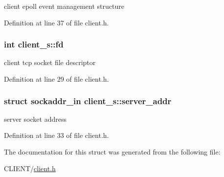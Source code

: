 client epoll event management structure 



Definition at line 37 of file client.\-h.

\hypertarget{structclient__s_a9babf0c4dea4b555e6b87a47f4ca98cd}{
\subsubsection[{fd}]{\setlength{\rightskip}{0pt plus 5cm}int client\-\_\-s\-::fd}}\label{structclient__s_a9babf0c4dea4b555e6b87a47f4ca98cd}


client tcp socket file descriptor 



Definition at line 29 of file client.\-h.

\hypertarget{structclient__s_a4cb8f28435762b205424d16ea39dcab3}{
\subsubsection[{server\-\_\-addr}]{\setlength{\rightskip}{0pt plus 5cm}struct sockaddr\-\_\-in client\-\_\-s\-::server\-\_\-addr}}\label{structclient__s_a4cb8f28435762b205424d16ea39dcab3}


server socket address 



Definition at line 33 of file client.\-h.



The documentation for this struct was generated from the following file\-:\begin{DoxyCompactItemize}
\item 
C\-L\-I\-E\-N\-T/\hyperlink{client_8h}{client.\-h}\end{DoxyCompactItemize}
